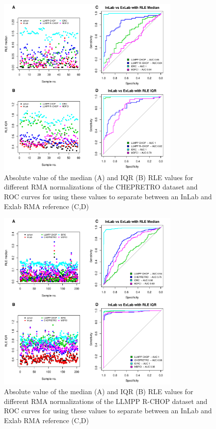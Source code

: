 \documentclass{article}
\begin{document}
\begin{figure}[!h]
	\begin{center}
			\includegraphics[width=0.8\textwidth]{figures/chep_rle.pdf}
	\end{center}
	\caption{Absolute value of the median (A) and IQR (B) RLE values for different RMA normalizations of the CHEPRETRO dataset and ROC curves for using these values to separate between an InLab and Exlab RMA reference (C,D)}
	\label{fig:chep_rle}
\end{figure}

\begin{figure}[!h]
	\begin{center}
			\includegraphics[width=0.8\textwidth]{figures/RCHOP_rle.pdf}
	\end{center}
	\caption{Absolute value of the median (A) and IQR (B) RLE values for different RMA normalizations of the LLMPP R-CHOP dataset and ROC curves for using these values to separate between an InLab and Exlab RMA reference (C,D)}
	\label{fig:rchop_rle}
\end{figure}
\end{document}
